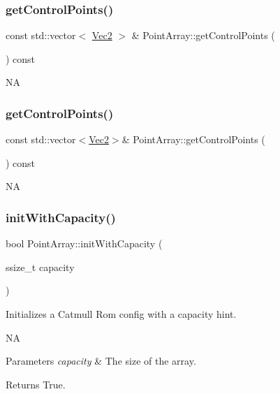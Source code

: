 \subsubsection{\texorpdfstring{get\+Control\+Points()}{getControlPoints()}\hspace{0.1cm}{\footnotesize\ttfamily [1/2]}}
{\footnotesize\ttfamily const std\+::vector$<$ \hyperlink{classVec2}{Vec2} $>$ \& Point\+Array\+::get\+Control\+Points (\begin{DoxyParamCaption}{ }\end{DoxyParamCaption}) const}

NA \mbox{\label{classPointArray_ac467c632dd1bd1f7c9c3f5002e2b52ce}} 
\subsubsection{\texorpdfstring{get\+Control\+Points()}{getControlPoints()}\hspace{0.1cm}{\footnotesize\ttfamily [2/2]}}
{\footnotesize\ttfamily const std\+::vector$<$\hyperlink{classVec2}{Vec2}$>$\& Point\+Array\+::get\+Control\+Points (\begin{DoxyParamCaption}{ }\end{DoxyParamCaption}) const}

NA \mbox{\label{classPointArray_a3b4567bbb7c2eed2f01d6331397f3858}} 
\subsubsection{\texorpdfstring{init\+With\+Capacity()}{initWithCapacity()}\hspace{0.1cm}{\footnotesize\ttfamily [1/2]}}
{\footnotesize\ttfamily bool Point\+Array\+::init\+With\+Capacity (\begin{DoxyParamCaption}\item[{ssize\+\_\+t}]{capacity }\end{DoxyParamCaption})}

Initializes a Catmull Rom config with a capacity hint.

NA 
\begin{DoxyParams}{Parameters}
{\em capacity} & The size of the array. \\
\hline
\end{DoxyParams}
\begin{DoxyReturn}{Returns}
True. 
\end{DoxyReturn}
\mbox{\label{classPointArray_a3b4567bbb7c2eed2f01d6331397f3858}} 
